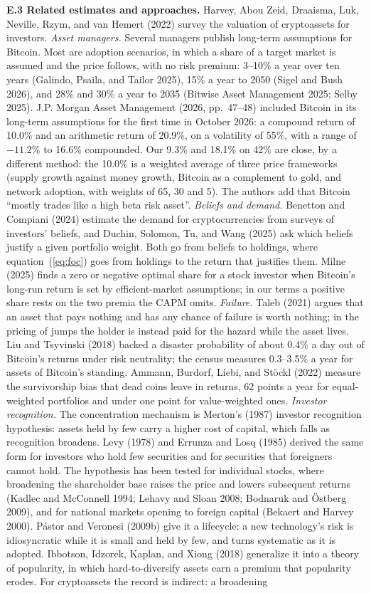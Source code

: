 \documentclass[11pt]{article}
\begin{document}
\textbf{E.3 Related estimates and approaches.} Harvey, Abou Zeid, Draaisma, Luk, Neville, Rzym, and van Hemert (2022) survey the valuation of cryptoassets for investors. \emph{Asset managers.} Several managers publish long-term assumptions for Bitcoin. Most are adoption scenarios, in which a share of a target market is assumed and the price follows, with no risk premium: 3--10\% a year over ten years (Galindo, Psaila, and Tailor 2025), 15\% a year to 2050 (Sigel and Bush 2026), and 28\% and 30\% a year to 2035 (Bitwise Asset Management 2025; Selby 2025). J.P. Morgan Asset Management (2026, pp.\ 47--48) included Bitcoin in its long-term assumptions for the first time in October 2026: a compound return of 10.0\% and an arithmetic return of 20.9\%, on a volatility of 55\%, with a range of $-11.2\%$ to 16.6\% compounded. Our 9.3\% and 18.1\% on 42\% are close, by a different method: the 10.0\% is a weighted average of three price frameworks (supply growth against money growth, Bitcoin as a complement to gold, and network adoption, with weights of 65, 30 and 5). The authors add that Bitcoin ``mostly trades like a high beta risk asset''. \emph{Beliefs and demand.} Benetton and Compiani (2024) estimate the demand for cryptocurrencies from surveys of investors' beliefs, and Duchin, Solomon, Tu, and Wang (2025) ask which beliefs justify a given portfolio weight. Both go from beliefs to holdings, where equation~(\ref{eq:foc}) goes from holdings to the return that justifies them. Milne (2025) finds a zero or negative optimal share for a stock investor when Bitcoin's long-run return is set by efficient-market assumptions; in our terms a positive share rests on the two premia the CAPM omits. \emph{Failure.} Taleb (2021) argues that an asset that pays nothing and has any chance of failure is worth nothing; in the pricing of jumps the holder is instead paid for the hazard while the asset lives. Liu and Tsyvinski (2018) backed a disaster probability of about 0.4\% a day out of Bitcoin's returns under risk neutrality; the census measures 0.3--3.5\% a year for assets of Bitcoin's standing. Ammann, Burdorf, Liebi, and St\"ockl (2022) measure the survivorship bias that dead coins leave in returns, 62 points a year for equal-weighted portfolios and under one point for value-weighted ones. \emph{Investor recognition.} The concentration mechanism is Merton's (1987) investor recognition hypothesis: assets held by few carry a higher cost of capital, which falls as recognition broadens. Levy (1978) and Errunza and Losq (1985) derived the same form for investors who hold few securities and for securities that foreigners cannot hold. The hypothesis has been tested for individual stocks, where broadening the shareholder base raises the price and lowers subsequent returns (Kadlec and McConnell 1994; Lehavy and Sloan 2008; Bodnaruk and \"Ostberg 2009), and for national markets opening to foreign capital (Bekaert and Harvey 2000). P\'astor and Veronesi (2009b) give it a lifecycle: a new technology's risk is idiosyncratic while it is small and held by few, and turns systematic as it is adopted. Ibbotson, Idzorek, Kaplan, and Xiong (2018) generalize it into a theory of popularity, in which hard-to-diversify assets earn a premium that popularity erodes. For cryptoassets the record is indirect: a broadening 
\end{document}
